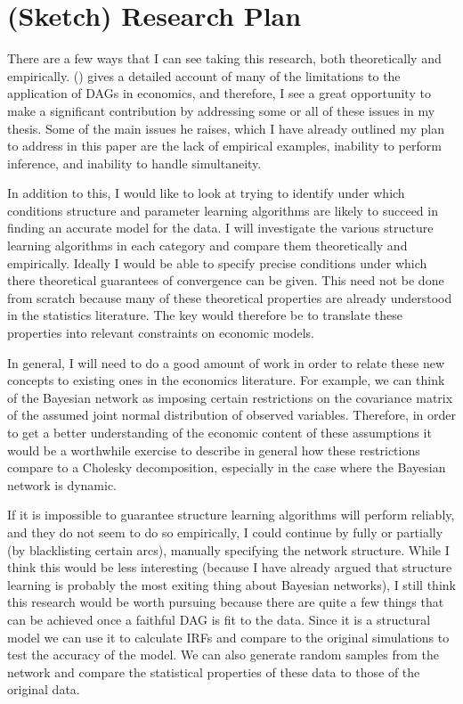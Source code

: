 \documentclass{article}
\begin{document}
\section{(Sketch) Research Plan}
There are a few ways that I can see taking this research, both theoretically and empirically. \citeauthor{imbens2019potential} (\citeyear{imbens2019potential}) gives a detailed account of many of the limitations to the application of DAGs in economics, and therefore, I see a great opportunity to make a significant contribution by addressing some or all of these issues in my thesis. Some of the main issues he raises, which I have already outlined my plan to address in this paper are the lack of empirical examples, inability to perform inference, and inability to handle simultaneity.

In addition to this, I would like to look at trying to identify under which conditions structure and parameter learning algorithms are likely to succeed in finding an accurate model for the data. I will investigate the various structure learning algorithms in each category and compare them theoretically and empirically. Ideally I would be able to specify precise conditions under which there theoretical guarantees of convergence can be given. This need not be done from scratch because many of these theoretical properties are already understood in the statistics literature. The key would therefore be to translate these properties into relevant constraints on economic models.

In general, I will need to do a good amount of work in order to relate these new concepts to existing ones in the economics literature. For example, we can think of the Bayesian network as imposing certain restrictions on the covariance matrix of the assumed joint normal distribution of observed variables. Therefore, in order to get a better understanding of the economic content of these assumptions it would be a worthwhile exercise to describe in general how these restrictions compare to a Cholesky decomposition, especially in the case where the Bayesian network is dynamic. 

If it is impossible to guarantee structure learning algorithms will perform reliably, and they do not seem to do so empirically, I could continue by fully or partially (by blacklisting certain arcs), manually specifying the network structure. While I think this would be less interesting (because I have already argued that structure learning is probably the most exiting thing about Bayesian networks), I still think this research would be worth pursuing because there are quite a few things that can be achieved once a faithful DAG is fit to the data. Since it is a structural model we can use it to calculate IRFs and compare to the original simulations to test the accuracy of the model. We can also generate random samples from the network and compare the statistical properties of these data to those of the original data.
\end{document}
